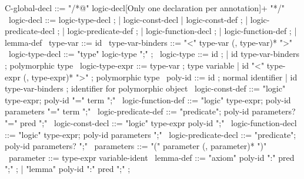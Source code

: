 \begin{syntax}
  C-global-decl ::= "/*@" logic-decl{[Only one declaration per annotation]+} "*/"
  \
  logic-decl ::= logic-type-decl ;
          | logic-const-decl | logic-const-def ;
          | logic-predicate-decl ;
          | logic-predicate-def ;
          | logic-function-decl ;
          | logic-function-def ;
          | lemma-def
  \
  type-var ::= id
  \
  type-var-binders ::= "<" type-var (, type-var)* ">"
  \
  logic-type-decl ::= "type" logic-type ";" ;
  \
  logic-type ::= id ;
  | id type-var-binders ; polymorphic type
  \
  logic-type-expr ::= type-var ; type variable
  | id "<" type-expr (, type-expr)* ">" ; polymorphic type
  \
  poly-id ::= id ; normal identifier
  | id type-var-binders ; identifier for polymorphic object
  \
  logic-const-def ::= {"logic" type-expr};
    {poly-id "=" term ";"}
  \
  logic-function-def ::= "logic" type-expr;
  poly-id parameters "=" term ";"
  \
  logic-predicate-def ::=
  "predicate";
  poly-id parameters? "=" pred ";"
  \
  logic-const-decl ::= { "logic" type-expr poly-id ";"}
  \
  logic-function-decl ::=
  "logic" type-expr;
  poly-id parameters ";"
  \
  logic-predicate-decl ::=
  "predicate";
  poly-id parameters? ";"
  \
  parameters ::= "(" parameter (, parameter)* ")"
  \
  parameter ::= type-expr variable-ident
  \
  lemma-def ::= "axiom" poly-id ":" pred ";" ;
  | "lemma" poly-id ":" pred ";" ;
\end{syntax}